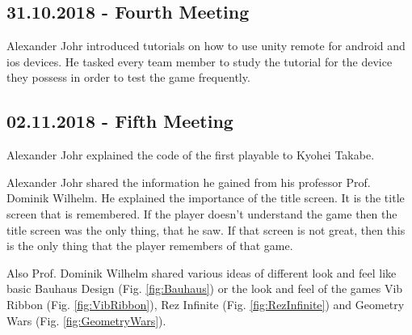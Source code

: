 \subsection{31.10.2018 - Fourth Meeting}

Alexander Johr introduced tutorials on how to use unity remote for android and ios devices. He tasked every team member to study the tutorial for the device they possess in order to test the game frequently.

\subsection{02.11.2018 - Fifth Meeting}
Alexander Johr explained the code of the first playable to Kyohei Takabe.

Alexander Johr shared the information he gained from his professor Prof. Dominik Wilhelm. He explained the importance of the title screen. It is the title screen that is remembered. If the player doesn’t understand the game then the title screen was the only thing, that he saw. If that screen is not great, then this is the only thing that the player remembers of that game.

Also Prof. Dominik Wilhelm shared various ideas of different look and feel like basic Bauhaus Design (Fig. \ref{fig:Bauhaus}) or the look and feel of the games Vib Ribbon (Fig. \ref{fig:VibRibbon}), Rez Infinite (Fig. \ref{fig:RezInfinite}) and Geometry Wars (Fig. \ref{fig:GeometryWars}).

